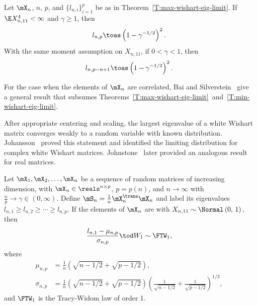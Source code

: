 \begin{theorem}\label{T:min-wishart-eig-limit}
    Let $\mX_n$, $n$, $p$, and $\{ l_{n,i} \}_{i=1}^p$ be as in
    Theorem~\ref{T:max-wishart-eig-limit}.  If $\E X_{n,11}^4 < \infty$ and
    $\gamma \geq 1$, then
    \[
        l_{n,p} \toas \left( 1 - \gamma^{-1/2} \right)^2.
    \]
    With the same moment assumption on $X_{n,11}$, if $0 < \gamma < 1$, then
    \[
        l_{n,p-n+1} \toas \left( 1 - \gamma^{-1/2} \right)^2.
    \]
\end{theorem}

\noindent
For the case when the elements of $\mX_n$ are correlated, Bai and Silverstein~\cite{bai1998neo} give a general result that subsumes Theorems~\ref{T:max-wishart-eig-limit}~and~\ref{T:min-wishart-eig-limit}.

After appropriate centering and scaling, the largest eigenvalue of a white
Wishart matrix converges weakly to a random variable with known distribution.
Johansson~\cite{johansson2000sfa} proved this statement and identified the
limiting distribution for complex white Wishart matrices.  Johnstone~\cite{johnstone2001dle} later provided an analogous result for real matrices.  

\begin{theorem}\label{T:tw-limit-largest}
    Let $\mX_1, \mX_2, \ldots, \mX_n$ be a sequence of random matrices of
    increasing dimension, with $\mX_n \in \reals^{n\times p}$, $p = p(n)$,
    and $n \to \infty$ with $\frac{n}{p} \to \gamma \in (0, \infty)$.  Define
    $\mS_n = \frac{1}{n} \mX_n^\trans \mX_n$ and label its eigenvalues
    \(
        l_{n,1} \geq l_{n,2} \geq \cdots \geq l_{n,p}.
    \)
    If the elements of $\mX_n$ are \iid with
    \(
        X_{n,11} \sim \Normal\left( 0, \, 1 \right),
    \)
    then
    \[
        \frac{l_{n,1} - \mu_{n,p}}{\sigma_{n,p}}
        \tod
        W_1
        \sim
        \FTW_1,
    \]
    where
    \begin{align*}
        \mu_{n,p} 
            &=
            \frac{1}{n}
            \left(
                \sqrt{n - 1/2}
                +
                \sqrt{p - 1/2}
            \right), \\
        \sigma_{n,p}
            &= 
            \frac{1}{n}
            \left(
                \sqrt{n - 1/2}
                +
                \sqrt{p - 1/2}
            \right)
            \left(
                \frac{1}{\sqrt{n - 1/2}}
                +
                \frac{1}{\sqrt{p - 1/2}}
            \right)^{1/3},
    \end{align*}
    and $\FTW_1$ is the Tracy-Widom law of order 1.
\end{theorem}

